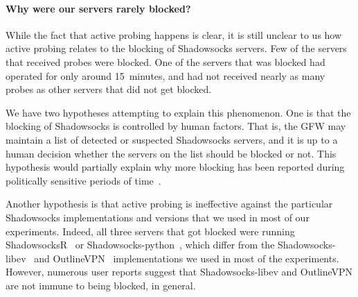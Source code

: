 \documentclass[sigconf,letterpaper]{acmart}
\begin{document}

\paragraph{Why were our servers rarely blocked?}

While the fact that active probing happens is clear,
it is still unclear to us how active probing relates to the blocking of Shadowsocks servers.
Few of the servers that received probes were blocked.
One of the servers that was blocked had operated for only around 15~minutes,
and had not received nearly as many probes as other servers that did not get blocked.


We have two hypotheses attempting to explain this phenomenon.
One is that the blocking of Shadowsocks is controlled by human factors.
That is, the GFW may maintain a list of detected or suspected Shadowsocks servers,
and it is up to a human decision whether the servers on the list should be blocked or not.
This hypothesis would partially explain why more blocking has been reported during politically sensitive periods of time~\cite{bbs2017blocking, Fifield2019blocking}.

Another hypothesis is that active probing is ineffective against the particular Shadowsocks implementations and versions that we used in most of our experiments.
Indeed, all three servers that got blocked were running ShadowsocksR~\cite{shadowsocksr-csharp} or Shadowsocks-python~\cite{shadowsocks-python},
which differ from the Shadowsocks-libev~\cite{shadowsocks-libev} and OutlineVPN~\cite{outline} implementations we used in most of the experiments.
However, numerous user reports suggest that Shadowsocks-libev and OutlineVPN are not immune to being blocked, in general.

\end{document}
